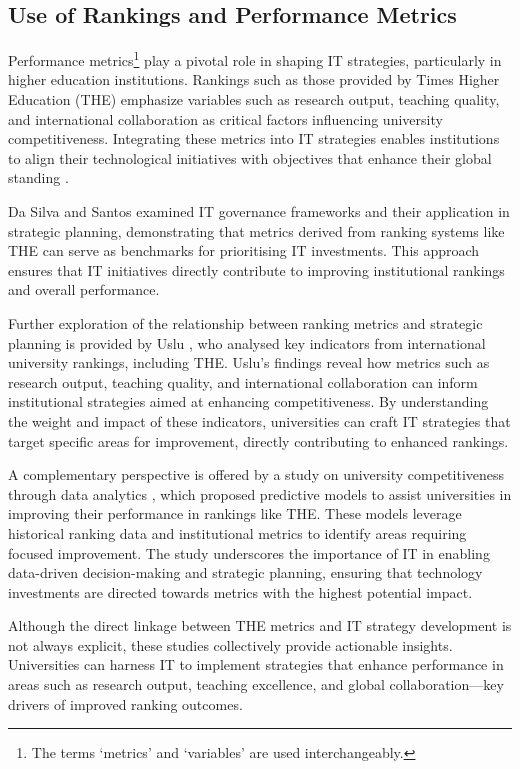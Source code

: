 \documentclass[sigconf]{acmart}
\begin{document}
\subsection{Use of Rankings and Performance Metrics}

Performance metrics\footnote{The terms `metrics' and `variables' are used interchangeably.} play a pivotal role in shaping IT strategies, particularly in higher education institutions. Rankings such as those provided by Times Higher Education (THE) emphasize variables such as research output, teaching quality, and international collaboration as critical factors influencing university competitiveness. Integrating these metrics into IT strategies enables institutions to align their technological initiatives with objectives that enhance their global standing \cite{times2023methodology}.

Da Silva and Santos \cite{dasilva2014cobit} examined IT governance frameworks and their application in strategic planning, demonstrating that metrics derived from ranking systems like THE can serve as benchmarks for prioritising IT investments. This approach ensures that IT initiatives directly contribute to improving institutional rankings and overall performance.

Further exploration of the relationship between ranking metrics and strategic planning is provided by Uslu \cite{uslu2020university}, who analysed key indicators from international university rankings, including THE. Uslu's findings reveal how metrics such as research output, teaching quality, and international collaboration can inform institutional strategies aimed at enhancing competitiveness. By understanding the weight and impact of these indicators, universities can craft IT strategies that target specific areas for improvement, directly contributing to enhanced rankings.

A complementary perspective is offered by a study on university competitiveness through data analytics \cite{analytics2022competitiveness}, which proposed predictive models to assist universities in improving their performance in rankings like THE. These models leverage historical ranking data and institutional metrics to identify areas requiring focused improvement. The study underscores the importance of IT in enabling data-driven decision-making and strategic planning, ensuring that technology investments are directed towards metrics with the highest potential impact.

Although the direct linkage between THE metrics and IT strategy development is not always explicit, these studies collectively provide actionable insights. Universities can harness IT to implement strategies that enhance performance in areas such as research output, teaching excellence, and global collaboration—key drivers of improved ranking outcomes.
\end{document}
